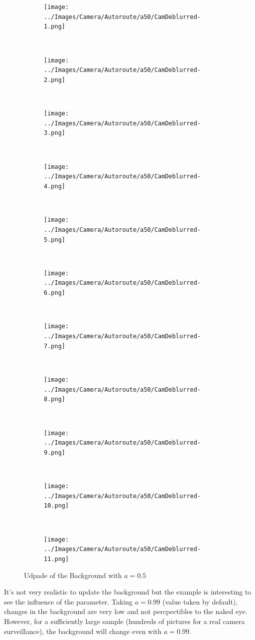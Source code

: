 \begin{figure}[h]
\centering
\begin{subfigure}{0.20\textwidth}
\texttt{[image: ../Images/Camera/Autoroute/a50/CamDeblurred-1.png]}
\caption{}
\label{fig:UAut1}
\end{subfigure}
~
\begin{subfigure}{0.20\textwidth}
\texttt{[image: ../Images/Camera/Autoroute/a50/CamDeblurred-2.png]}
\caption{}
\label{fig:UAut2}
\end{subfigure}
~
\begin{subfigure}{0.20\textwidth}
\texttt{[image: ../Images/Camera/Autoroute/a50/CamDeblurred-3.png]}
\caption{}
\label{fig:UAut3}
\end{subfigure}
~
\begin{subfigure}{0.20\textwidth}
\texttt{[image: ../Images/Camera/Autoroute/a50/CamDeblurred-4.png]}
\caption{}
\label{fig:UAut4}
\end{subfigure}
~
\begin{subfigure}{0.20\textwidth}
\texttt{[image: ../Images/Camera/Autoroute/a50/CamDeblurred-5.png]}
\caption{}
\label{fig:UAut5}
\end{subfigure}
~
\begin{subfigure}{0.20\textwidth}
\texttt{[image: ../Images/Camera/Autoroute/a50/CamDeblurred-6.png]}
\caption{}
\label{fig:UAut6}
\end{subfigure}
~
\begin{subfigure}{0.20\textwidth}
\texttt{[image: ../Images/Camera/Autoroute/a50/CamDeblurred-7.png]}
\caption{}
\label{fig:UAut7}
\end{subfigure}
~
\begin{subfigure}{0.20\textwidth}
\texttt{[image: ../Images/Camera/Autoroute/a50/CamDeblurred-8.png]}
\caption{}
\label{fig:UAut8}
\end{subfigure}
~
\begin{subfigure}{0.20\textwidth}
\texttt{[image: ../Images/Camera/Autoroute/a50/CamDeblurred-9.png]}
\caption{}
\label{fig:UAut9}
\end{subfigure}
~
\begin{subfigure}{0.20\textwidth}
\texttt{[image: ../Images/Camera/Autoroute/a50/CamDeblurred-10.png]}
\caption{}
\label{fig:UAut10}
\end{subfigure}
~
\begin{subfigure}{0.20\textwidth}
\texttt{[image: ../Images/Camera/Autoroute/a50/CamDeblurred-11.png]}
\caption{}
\label{fig:UAut11}
\end{subfigure}
\caption{Udpade of the Background with $a=0.5$}
\label{fig:Udpade}
\end{figure}

It's not very realistic to update the background but the example is interesting to see the influence of the parameter. Taking $a = 0.99$ (value taken by default), changes in the background are very low and not percpectibles to the naked eye. However, for a sufficiently large sample (hundreds of pictures for a real camera surveillance), the background will change even with $a=0.99$. 